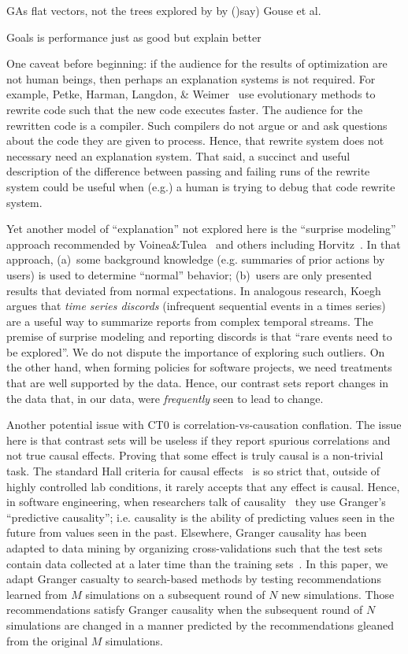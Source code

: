 \documentclass[runningheads]{llncs}
\begin{document}
GAs flat vectors, not the trees explored by by ()say) Gouse et al.

Goals is performance just as good but explain better

One caveat before beginning: if the audience for the
results of optimization are not human beings, then
perhaps an explanation systems is not required. For
example, Petke, Harman, Langdon, \&
Weimer~\cite{petke14} use evolutionary methods to
rewrite code such that the new code executes
faster. The audience for the rewritten code is a
compiler. Such compilers do not argue or and ask
questions about the code they are given to process.
Hence, that rewrite system does not necessary need
an explanation system.  That said, a succinct and
useful description of the difference between passing
and failing runs of the rewrite system could be
useful when (e.g.) a human is trying to debug that
code rewrite system.

Yet another model of ``explanation'' not explored
here is the ``surprise modeling'' approach
recommended by Voinea\&Tulea~\cite{voinea07} and
others including Horvitz~\cite{horvitz05}. In that
approach, (a)~some background knowledge
(e.g. summaries of prior actions by users) is used
to determine ``normal'' behavior; (b)~users are only
presented results that deviated from normal
expectations. In analogous research,
Koegh~\cite{keogh05} argues that {\em time series
  discords} (infrequent sequential events in a times
series) are a useful way to summarize reports from
complex temporal streams. The premise of surprise
modeling and reporting discords is that ``rare
events need to be explored''.  We do not dispute the
importance of exploring such outliers.  On the other
hand, when forming policies for software projects,
we need treatments that are well supported by the
data. Hence, our contrast sets report changes in the
data that, in our data, were {\em frequently} seen to
lead to change.

Another potential issue with CT0 is
correlation-vs-causation conflation. The issue here
is that contrast sets will be useless if they
report spurious correlations and not true causal
effects.  Proving that some effect is truly causal
is a non-trivial task.  The standard Hall criteria
for causal effects~\cite{paul13} is so strict that,
outside of highly controlled lab conditions, it
rarely accepts that any effect is causal.  Hence, in
software engineering, when researchers talk of
causality~\cite{couto14,zheng14z,huber09,bhat!icse12}
they use Granger's ``predictive causality'';
i.e. causality is the ability of predicting
values seen in the future from values seen in the
past.  Elsewhere, Granger causality has been adapted
to data mining by organizing cross-validations such
that the test sets contain data collected at a later
time than the training sets~\cite{me11f}.  In this
paper, we adapt Granger casualty to search-based
methods by testing recommendations learned from $M$
simulations on a subsequent round of $N$ new
simulations.  Those recommendations satisfy Granger
causality when the subsequent round of $N$
simulations are changed in a manner predicted by the
recommendations gleaned from the original $M$
simulations.
\end{document}
